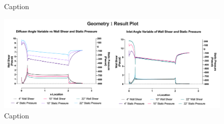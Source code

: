 \begin{figure}[t]
    \noindent{}
    \caption{Caption}
    \label{fig:2D_OF_A3_Contour}
\end{figure}

\begin{figure}[!ht]
    \centering
    \includegraphics[scale=0.85]{Figures/2D_OF/2D_OF_A1_PRESS_WShear_PLOT.png}
    \caption{Caption}
    \label{fig:2D_OF_A1_PLOT}
\end{figure}


